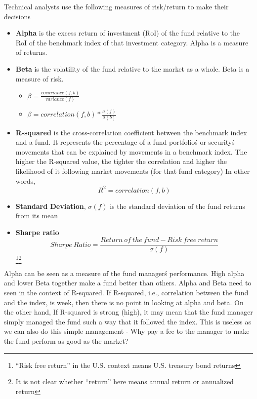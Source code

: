 Technical analysts use the following measures of risk/return to make their decisions
	\begin{itemize}
	\item \textbf{Alpha} is the excess return of investment (RoI) of the fund relative to the RoI of the benchmark index of that investment category. Alpha is a measure of returns.
	\item \textbf{Beta} is the volatility of the fund relative to the market as a whole. Beta is a measure of risk.
		\begin{itemize}
		\item $\beta = \frac{covariance(f, b)}{variance(f)} $
		\item $\beta = correlation(f, b) * \frac{\sigma(f)}{\sigma(b)} $
		\end{itemize}
	\item \textbf{R-squared} is the cross-correlation coefficient between the benchmark index and a fund. It represents the percentage of a fund portfolio\'s or security\'s movements that can be explained by movements in a benchmark index. The higher the R-squared value, the tighter the correlation and higher the likelihood of it following market movements (for that fund category)
In other words,
	$$R^2 = correlation(f,b)$$
	\item \textbf{Standard Deviation}, $\sigma(f)$ is the standard deviation of the fund returns from its mean
	\item \textbf{Sharpe ratio} 
	$$ Sharpe\: Ratio = \frac{Return\: of\: the\: fund - Risk\: free\: return}{\sigma(f)}$$\footnote{``Risk free return'' in the U.S. context means U.S. treasury bond returns}\footnote{It is not clear whether ``return'' here means annual return or annualized return}
	\end{itemize}

Alpha can be seen as a measure of the fund manager\'s performance. High alpha and lower Beta together make a fund better than others. Alpha and Beta need to seen in the context of R-squared. If R-squared, i.e., correlation between the fund and the index, is week, then there is no point in looking at alpha and beta. On the other hand, If R-squared is strong (high), it may mean that the fund manager simply managed the fund such a way that it followed the index. This is useless as we can also do this simple management - Why pay a fee to the manager to make the fund perform as good as the market?
